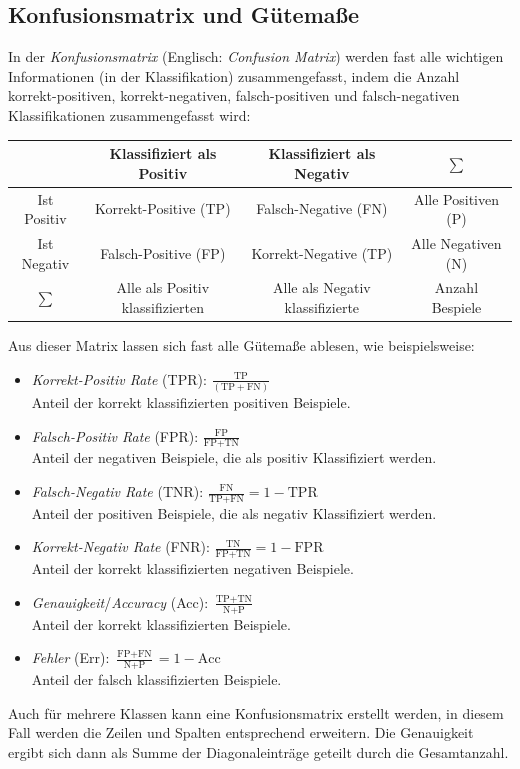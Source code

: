 		\subsection{Konfusionsmatrix und Gütemaße}
			In der \emph{Konfusionsmatrix} (Englisch: \emph{Confusion Matrix}) werden fast alle wichtigen Informationen (in der Klassifikation) zusammengefasst, indem die Anzahl korrekt-positiven, korrekt-negativen, falsch-positiven und falsch-negativen Klassifikationen zusammengefasst wird:
			\begin{center}
				\begin{tabular}{c|c|c|c}
					            &    Klassifiziert als Positiv     &    Klassifiziert als Negativ    &      \(\sum\)      \\ \hline
					Ist Positiv &      Korrekt-Positive (TP)       &      Falsch-Negative (FN)       & Alle Positiven (P) \\ \hline
					Ist Negativ &       Falsch-Positive (FP)       &      Korrekt-Negative (TP)      & Alle Negativen (N) \\ \hline
					 \(\sum\)   & Alle als Positiv klassifizierten & Alle als Negativ klassifizierte &  Anzahl Bespiele
				\end{tabular}
			\end{center}
			Aus dieser Matrix lassen sich fast alle Gütemaße ablesen, wie beispielsweise:
			\begin{itemize}
				\item \emph{Korrekt-Positiv Rate} (TPR): \( \displaystyle  \frac{\text{TP}}{(\text{TP} + \text{FN})} \) \\
					Anteil der korrekt klassifizierten positiven Beispiele.
				\item \emph{Falsch-Positiv Rate} (FPR): \( \displaystyle  \frac{\text{FP}}{\text{FP} + \text{TN}} \) \\
					Anteil der negativen Beispiele, die als positiv Klassifiziert werden.
				\item \emph{Falsch-Negativ Rate} (TNR): \( \displaystyle  \frac{\text{FN}}{\text{TP} + \text{FN}} = 1 - \text{TPR} \) \\
					Anteil der positiven Beispiele, die als negativ Klassifiziert werden.
				\item \emph{Korrekt-Negativ Rate} (FNR): \( \displaystyle  \frac{\text{TN}}{\text{FP} + \text{TN}} = 1 - \text{FPR} \) \\
					Anteil der korrekt klassifizierten negativen Beispiele.
				\item \emph{Genauigkeit}/\emph{Accuracy} (Acc): \( \displaystyle  \frac{\text{TP} + \text{TN}}{\text{N} + \text{P}} \) \\
					Anteil der korrekt klassifizierten Beispiele.
				\item \emph{Fehler} (Err): \( \displaystyle  \frac{\text{FP} + \text{FN}}{\text{N} + \text{P}} = 1 - \text{Acc} \) \\
					Anteil der falsch klassifizierten Beispiele.
			\end{itemize}
			Auch für mehrere Klassen kann eine Konfusionsmatrix erstellt werden, in diesem Fall werden die Zeilen und Spalten entsprechend erweitern. Die Genauigkeit ergibt sich dann als Summe der Diagonaleinträge geteilt durch die Gesamtanzahl.

